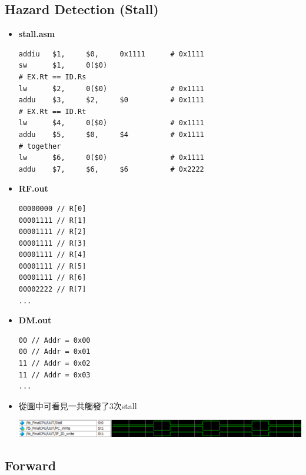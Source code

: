 \documentclass[12pt]{article}
\begin{document}
\subsection{Hazard Detection (Stall)}

\begin{itemize}
    \item \textbf{stall.asm}
    \begin{lstlisting}[language={[mips]Assembler}, frame=single]
addiu   $1,     $0,     0x1111      # 0x1111
sw      $1,     0($0)
# EX.Rt == ID.Rs
lw      $2,     0($0)               # 0x1111
addu    $3,     $2,     $0          # 0x1111
# EX.Rt == ID.Rt
lw      $4,     0($0)               # 0x1111
addu    $5,     $0,     $4          # 0x1111
# together
lw      $6,     0($0)               # 0x1111
addu    $7,     $6,     $6          # 0x2222
    \end{lstlisting}

    \item \textbf{RF.out}
    \begin{lstlisting}[language={}]
00000000 // R[0]
00001111 // R[1]
00001111 // R[2]
00001111 // R[3]
00001111 // R[4]
00001111 // R[5]
00001111 // R[6]
00002222 // R[7]
...
    \end{lstlisting}

    \item \textbf{DM.out}
    \begin{lstlisting}[language={}]
00 // Addr = 0x00
00 // Addr = 0x01
11 // Addr = 0x02
11 // Addr = 0x03
...
    \end{lstlisting}
    \item 從圖中可看見一共觸發了3次stall
    \begin{center}
        \includegraphics[width=\linewidth]{stall.png}
    \end{center}
\end{itemize}

\subsection{Forward}
\end{document}
